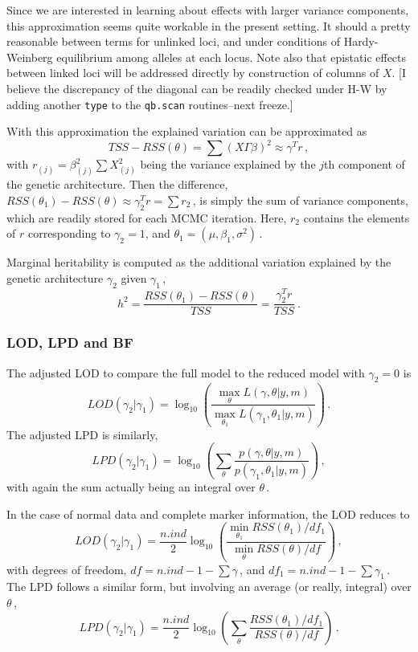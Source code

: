 \documentclass[12pt]{article}
\begin{document}
Since we are interested in learning about effects with larger
variance components, this approximation seems quite workable in the
present setting. It should a pretty reasonable between terms for
unlinked loci, and under conditions of Hardy-Weinberg equilibrium
among alleles at each locus. Note also that epistatic effects between
linked loci will be addressed directly by construction of columns of
$X$. 
[I believe the discrepancy of the diagonal can be readily checked
under H-W by adding another {\tt type} to the {\tt qb.scan}
routines--next freeze.] 

With this approximation the explained variation can be approximated as
$$
TSS-RSS(\theta)=\sum(X\Gamma\beta)^2 \approx \gamma^T r\,,
$$
with $r_{(j)}=\beta_{(j)}^2\sum X_{(j)}^2$ being the variance
explained by the $j$th component of the genetic architecture.
Then the difference, 
$RSS(\theta_1)-RSS(\theta) \approx \gamma_2^T r=\sum r_2$\,,
is simply the sum of variance components, which are readily stored for
each MCMC iteration. Here, $r_2$ contains the elements of $r$
corresponding to $\gamma_2 = 1$, and
$\theta_1=(\mu,\beta_1,\sigma^2)$\,.

Marginal heritability is computed as the additional variation
explained by the genetic architecture $\gamma_2$ given $\gamma_1$\,,
$$
h^2 = 
\frac{\displaystyle RSS(\theta_1) - RSS(\theta)}
{TSS}
=
\frac{\displaystyle \gamma_2^T r}
{TSS}
~.
$$

\subsubsection{LOD, LPD and BF}

The adjusted LOD to compare the full model to the reduced model with
$\gamma_2=0$ is
$$
LOD(\gamma_2\vert\gamma_1) = \log_{10} \left(
\frac{\displaystyle \max_{\theta} L(\gamma,\theta\vert y,m)}
{\displaystyle \max_{\theta_1} L(\gamma_1,\theta_1\vert y,m)}
\right)\,.
$$
The adjusted LPD is similarly,
$$
LPD(\gamma_2\vert\gamma_1) = \log_{10} \left(
\sum_{\theta}\frac{\displaystyle  p(\gamma,\theta\vert y,m)}
{\displaystyle p(\gamma_1,\theta_1\vert y,m)}
\right)\,,
$$
with again the sum actually being an integral over $\theta$\,.

In the case of normal data
and complete marker information, the LOD reduces to
$$
LOD(\gamma_2\vert\gamma_1) = \frac{n.ind}{2}
\log_{10} \left(
\frac{\displaystyle \min_{\theta_1} RSS(\theta_1)/df_1}
{\displaystyle \min_{\theta} RSS(\theta)/df}
\right)\,,
$$
with degrees of freedom, 
$df = n.ind - 1 - \sum\gamma$\,, and
$df_1 = n.ind - 1 - \sum\gamma_1$\,. The LPD follows a similar form,
but involving an average (or really, integral) over $\theta$\,,
$$
LPD(\gamma_2\vert\gamma_1) = \frac{n.ind}{2}
\log_{10} \left(
\sum_{\theta}
\frac{\displaystyle RSS(\theta_1)/df_1}
{\displaystyle RSS(\theta)/df}
\right)\,.
$$
\end{document}
